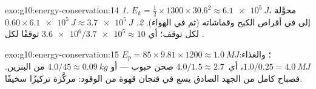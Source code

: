 \begin{solution}{exo:g10:energy-conservation:14}
\emph{1.} $E_k = \tfrac12 \times 1300 \times 30.6^2 \approx
\qty{6.1e5}{J}$، محوَّلة إلى  في أقراص الكبح
وقماشاته (ثم في الهواء).
\emph{2.} $0.60 \times \qty{6.1e5}{J} \approx \qty{3.7e5}{J}$ لكل
توقف؛ أي $\num{3.6e6}/\num{3.7e5} \approx 10$ توقفًا لكل .
\end{solution}

\begin{solution}{exo:g10:energy-conservation:15}
$E_p = 85 \times 9.81 \times 1200 \approx \qty{1.0}{MJ}$؛ والغذاء:
$1.0/0.25 = \qty{4.0}{MJ}$، أي\ $4.0/1.5 \approx 2.7$ صحن
حبوب --- أو $4.0/45 \approx \qty{0.09}{kg}$ من البنزين. فصباح كامل
من الجهد الصادق يسع في فنجان قهوة من الوقود:  مركَّزة تركيزًا سخيفًا.
\end{solution}

